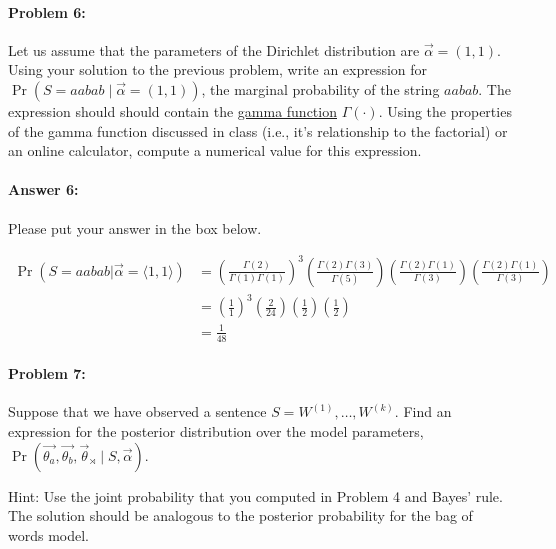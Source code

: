 \documentclass[10pt]{article}
\newenvironment{AnswerBox}{\begin{mdframed}[style=simple]}{\end{mdframed}}
\begin{document}
\hrulefill %

\paragraph{Problem 6:}


Let us assume that the parameters of the Dirichlet distribution are
$\vec{\alpha} = (1,1)$. Using your solution to the previous problem,
write an expression for $\Pr(S=aabab\mid \vec \alpha = (1,1))$,
the marginal probability of the string $aabab$.
The expression should should contain the
\href{https://en.wikipedia.org/wiki/Gamma_function}{gamma function}
$\Gamma(\cdot)$. Using the properties of the gamma function discussed
in class (i.e., it's relationship to the factorial) or an online
calculator, compute a numerical value for this expression.



\paragraph{Answer 6:} Please put your answer in the box below.


\begin{AnswerBox}%
\begin{align*}
      \Pr(S=aabab|\vec{\alpha}=\langle 1, 1 \rangle)  & = \left (\frac{\Gamma (2)}{\Gamma (1) \Gamma (1)}\right )^3 \left (\frac{\Gamma (2)\Gamma (3)}{\Gamma (5)}\right)\left(\frac{\Gamma (2)\Gamma (1)}{\Gamma (3)}\right)\left(\frac{\Gamma (2)\Gamma (1)}{\Gamma (3)}\right)\\
      & = \left(\frac{1}{1}\right)^3 \left(\frac{2}{24}\right)\left( \frac{1}{2}\right)\left( \frac{1}{2}\right)\\
      & = \frac{1}{48}
\end{align*}
\end{AnswerBox}%

\hrulefill %

\paragraph{Problem 7:}

Suppose that we have observed a sentence
$S=W^{(1)},\dots,W^{(k)}$. Find an expression for the posterior
distribution over the model parameters,
$\Pr(\vec{\theta_a}, \vec{\theta_b}, \vec{\theta}_{\rtimes} \mid S,\vec{\alpha})$.

 Hint: Use the joint probability that you computed in Problem
4 and Bayes' rule. The solution should be analogous to the posterior
probability for the bag of words model.
\end{document}
